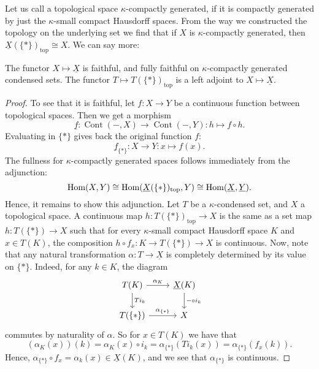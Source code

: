 \documentclass{article}
\DeclareMathOperator{\Cont}{Cont}
\renewcommand{\top}{\textrm{top}}
\begin{document}
Let us call a topological space $\kappa$-compactly generated, if
it is compactly generated by just the $\kappa$-small compact Hausdorff spaces.
From the way we constructed the topology on the underlying set
we find that if $X$ is $\kappa$-compactly generated,
then $\underline{X}(\{*\})_\top \cong X$. We can say more:
\begin{prop}
    \label{prop:compactly_generated_adjunction}
    The functor $X \mapsto \underline{X}$ is faithful, and fully
    faithful on $\kappa$-compactly generated condensed sets.
    The functor $T \mapsto T(\{*\})_\top$ is a left adjoint
    to $X \mapsto \underline{X}$.
\end{prop}
\begin{proof}
    To see that it is faithful, let $f\colon X \to Y$
    be a continuous function between topological spaces.
    Then we get a morphism
    \begin{equation*}
        \underline{f} \colon \Cont(-,X) \to \Cont(-, Y)\colon h \mapsto f\circ h.
    \end{equation*}
    Evaluating in $\{*\}$ gives back the original function $f$:
    \begin{equation*}
        \underline{f}_{\{*\}} \colon X \to Y\colon x \mapsto f(x).
    \end{equation*}
    The fullness for $\kappa$-compactly generated spaces
    follows immediately from the adjunction:
    \begin{equation*}
        \Hom(X, Y)\cong
        \Hom(\underline{X}(\{*\})_{\top}, Y) \cong
        \Hom(\underline{X}, \underline{Y}).
    \end{equation*}
    Hence, it remains to show this adjunction.
    Let $T$ be a $\kappa$-condensed set, and $X$ a topological space.
    A continuous map $h \colon T(\{*\})_\top \to X$ is the same as
    a set map $h \colon T(\{*\}) \to X$ such that for every $\kappa$-small
    compact Hausdorff space $K$ and $x\in T(K)$, the composition
    $h \circ f_x \colon K \to T(\{*\}) \to X$ is continuous. Now, note
    that any natural transformation $\alpha \colon T \to \underline{X}$
    is completely determined by its value on $\{*\}$. Indeed, for any
    $k\in K$, the diagram
    \begin{equation*}
        \begin{tikzcd}
            T(K) \dar["T{i_k}"] \rar["\alpha_K"] & \underline{X}(K) \dar["-\circ i_k"]\\
            T(\{*\}) \rar["\alpha_{\{*\}}"] & X
        \end{tikzcd}
    \end{equation*}
    commutes by naturality of $\alpha$. So for $x \in T(K)$ we have that
    \begin{equation*}
        (\alpha_K(x))(k) = \alpha_K(x)\circ i_k =
        \alpha_{\{*\}}(T{i_k}(x)) = \alpha_{\{*\}}(f_x(k)).
    \end{equation*}
    Hence, $\alpha_{\{*\}}\circ f_x = \alpha_k(x) \in \underline{X}(K)$,
    and we see that $\alpha_{\{*\}}$ is continuous.


\end{proof}
\end{document}
